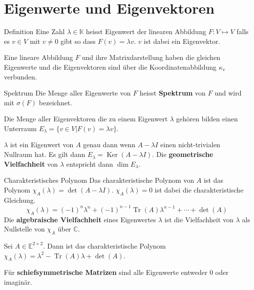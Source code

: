\documentclass[a4paper,10pt]{article}
\DeclareMathOperator{\Tr}{Tr}
\DeclareMathOperator{\Kernel}{Ker}
\def\C{\mathbb{C}}
\def\E{\mathbb{E}}
\def\K{\mathbb{K}}
\begin{document}
\section{Eigenwerte und Eigenvektoren}

\begin{mainbox}{Definition}
  Eine Zahl $\lambda \in \K$ heisst Eigenwert der linearen Abbildung $F: V \mapsto V$ falls es $v \in V$ mit $v \neq 0$ gibt so dass $F(v) = \lambda v$. $v$ ist dabei ein Eigenvektor. 
\end{mainbox}

Eine lineare Abbildung $F$ und ihre Matrixdarstellung haben die gleichen Eigenwerte und die Eigenvektoren sind über die Koordinatenabbildung $\kappa_v$ verbunden.

\begin{subbox}{Spektrum}
  Die Menge aller Eigenwerte von $F$ heisst \textbf{Spektrum} von $F$ und wird mit $\sigma(F)$ bezeichnet.
\end{subbox}

Die Menge aller Eigenvektoren die zu einem Eigenwert $\lambda$ gehören bilden einen Unterraum $E_\lambda = \{ v \in V | F(v) = \lambda v \}$.

$\lambda$ ist ein Eigenwert von $A$ genau dann wenn $A - \lambda I$ einen nicht-trivialen Nullraum hat. Es gilt dann $E_\lambda = \Kernel(A - \lambda I)$. Die \textbf{geometrische Vielfachheit} von $\lambda$ entspricht dann $\dim E_\lambda$.

\begin{subbox}{Charakteristisches Polynom}
  Das charakteristische Polynom von $A$ ist das Polynom $\chi_A(\lambda) = \det(A - \lambda I)$. $\chi_A(\lambda) = 0$ ist dabei die charakteristische Gleichung.
  $$\chi_A(\lambda) = (-1)^n \lambda^n + (-1)^{n-1} \Tr(A) \lambda^{n-1} + \cdots + \det(A)$$
  Die \textbf{algebraische Vielfachheit} eines Eigenwertes $\lambda$ ist die Vielfachheit von $\lambda$ als Nullstelle von $\chi_A$ über $\C$.
\end{subbox}

Sei $A \in \E^{2 \times 2}$. Dann ist das charakteristische Polynom $\chi_A(\lambda) = \lambda^2 - \Tr(A) \lambda + \det(A)$.

Für \textbf{schiefsymmetrische Matrizen} sind alle Eigenwerte entweder $0$ oder imaginär.
\end{document}
